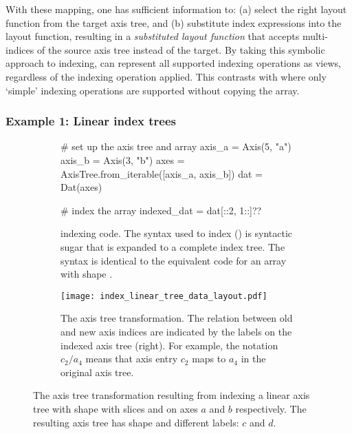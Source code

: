 \documentclass[thesis]{subfiles}
\begin{document}
With these mapping, one has sufficient information to:
(a) select the right layout function from the target axis tree, and
(b) substitute index expressions into the layout function, resulting in a \emph{substituted layout function} that accepts multi-indices of the source axis tree instead of the target.
By taking this symbolic approach to indexing,  can represent all supported indexing operations as views, regardless of the indexing operation applied.
This contrasts with \numpy{} where only `simple' indexing operations are supported without copying the array.

\subsubsection{Example 1: Linear index trees} \label{example:linear_index_tree}

\begin{figure}
  \centering
  \begin{subfigure}{.9\textwidth}
    \begin{pyalg2}
      # set up the axis tree and array
      axis_a = Axis(5, "a")
      axis_b = Axis(3, "b")
      axes = AxisTree.from_iterable([axis_a, axis_b])
      dat = Dat(axes)

      # index the array
      indexed_dat = dat[::2, 1::]?\label{code:index_linear_apply}?
    \end{pyalg2}

    \caption{
       indexing code.
      The syntax used to index  (\pycode{[::2, 1::]}) is syntactic sugar that is expanded to a complete index tree.
      The syntax is identical to the equivalent \numpy{} code for an array with shape .
    }
    \label{fig:index_linear_code}
  \end{subfigure}

  \vspace{1em}

  \begin{subfigure}{\textwidth}
    \centering
    \texttt{[image: index\_linear\_tree\_data\_layout.pdf]}
    \caption{
      The axis tree transformation.
      The relation between old and new axis indices are indicated by the labels on the indexed axis tree (right).
      For example, the notation $c_2/a_4$ means that axis entry $c_2$ maps to $a_4$ in the original axis tree.
    }
    \label{fig:index_linear_transform}
  \end{subfigure}

  \caption{
    The axis tree transformation resulting from indexing a linear axis tree with shape  with slices \pycode{[::2]} and \pycode{[1::]} on axes $a$ and $b$ respectively.
    The resulting axis tree has shape  and different labels: $c$ and $d$.
  }
  \label{fig:index_linear}
\end{figure}
\end{document}
